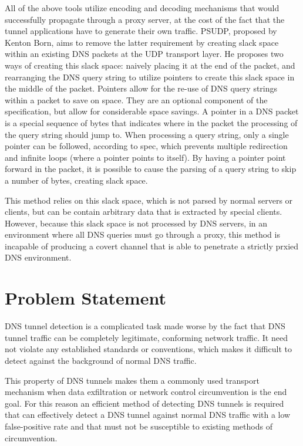 \documentclass{article}
\theoremstyle{remark}
\theoremstyle{definition}
\theoremstyle{definition}
\theoremstyle{definition}
\begin{document}
All of the above tools utilize encoding and decoding mechanisms that would
successfully propagate through a proxy server, at the cost of the fact
that the tunnel applications have to generate their own traffic. PSUDP, proposed
by Kenton Born, aims to remove the latter requirement by creating slack space
within an existing DNS packets at the UDP transport layer. He proposes two ways
of creating this slack space: naively placing it at the end of the packet, and
rearranging the DNS query string to utilize pointers to create this
slack space in the middle of the packet. Pointers allow
for the re-use of DNS query strings within a packet to save on space. They are
an optional component of the specification, but allow for considerable space
savings. A pointer in a DNS packet is a special sequence of bytes that
indicates where in the packet the processing of the query string should jump
to. When processing a query string, only a single pointer can be followed,
according to spec, which prevents multiple redirection and infinite loops
(where a pointer points to itself). By having a pointer point forward in the
packet, it is possible to cause the parsing of a query string to skip a number
of bytes, creating slack space.

This method relies on this slack space, which is not parsed by normal servers
or clients, but can be contain arbitrary data that is extracted by special
clients. However, because this slack space is not processed by DNS servers, in
an environment where all DNS queries must go through a proxy, this method is
incapable of producing a covert channel that is able to penetrate a strictly
prxied DNS environment.

\section{Problem Statement}

DNS tunnel detection is a complicated task made worse by the fact that DNS
tunnel traffic can be completely legitimate, conforming network traffic. It
need not violate any established standards or conventions, which makes it
difficult to detect against the background of normal DNS traffic.

This property of DNS tunnels makes them a commonly used transport mechanism
when data exfiltration or network control circumvention is the end goal. For
this reason an efficient method of detecting DNS tunnels is required that can
effectively detect a DNS tunnel against normal DNS traffic with a low
false-positive rate and that must not be susceptible to existing methods of
circumvention.
\end{document}
